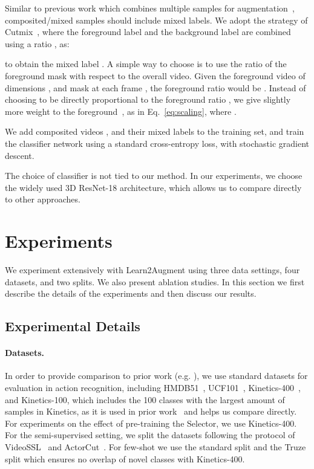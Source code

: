 \documentclass[runningheads]{llncs}
\newcommand{\Method}{Learn2Augment\xspace}
\begin{document}
Similar to previous work which combines multiple samples for augmentation~\cite{yun2019cutmix,actorcut}, composited/mixed samples should include mixed labels. We adopt the strategy of Cutmix~\cite{yun2019cutmix}, where the foreground label  and the background label  are combined using a ratio , as:

to obtain the mixed label . A simple way to choose  is to use the ratio of the foreground mask with respect to the overall video. Given the foreground video  of dimensions , and mask at each frame , the foreground ratio would be .
Instead of choosing  to be directly proportional to the foreground ratio , we give slightly more weight to the foreground~\cite{actorcut}, as in Eq.~\ref{eq:scaling}, where .

We add composited videos , and their mixed labels  to the training set, and train the classifier network using a standard cross-entropy loss, with stochastic gradient descent. 

The choice of classifier is not tied to our method. In our experiments, we choose the widely used 3D ResNet-18 architecture, which allows us to compare directly to other approaches.





\section{Experiments}
\label{sec:experiments}

We experiment extensively with \Method using three data settings, four datasets, and two splits. We also present ablation studies. In this section we first describe the details of the experiments and then discuss our results.


\subsection{Experimental Details}

\paragraph{Datasets.} In order to provide comparison to prior work (e.g. \cite{actorcut,tcl}), we use standard datasets for evaluation in action recognition, including HMDB51~\cite{hmdb}, UCF101~\cite{ucf}, Kinetics-400~\cite{carreira2017quo}, and Kinetics-100, which includes the 100 classes with the largest amount of samples in Kinetics, as it is used in prior work~\cite{Jing_2021_WACV} and helps us compare directly. For experiments on the effect of pre-training the Selector, we use Kinetics-400. For the semi-supervised setting, we split the datasets following the protocol of  VideoSSL~\cite{Jing_2021_WACV} and ActorCut~\cite{actorcut}. For few-shot we use the standard split \cite{arn} and the Truze split \cite{truze} which ensures no overlap of novel classes with Kinetics-400.
\end{document}
